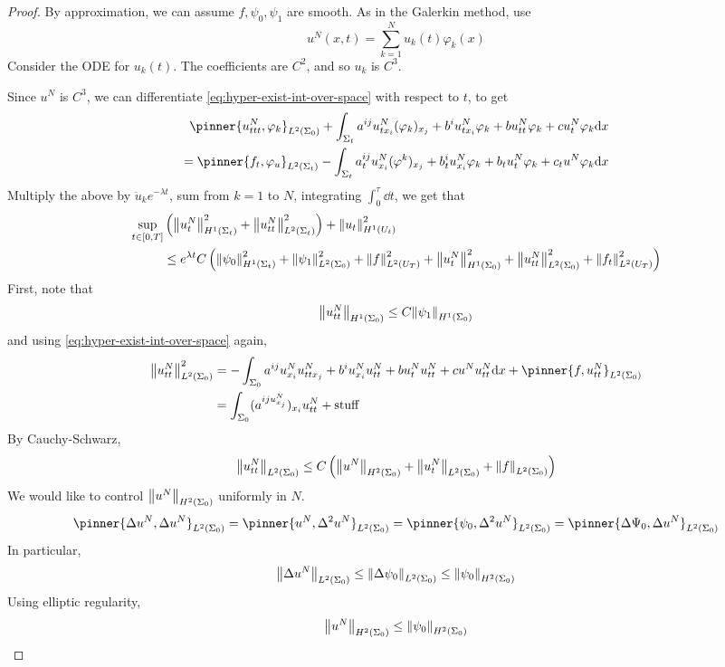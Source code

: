 \documentclass{article}
\begin{document}
\begin{proof}
    By approximation, we can assume \(f, \psi_0, \psi_1\) are smooth. As in the Galerkin method, use
    \[u^N(x, t) = \sum_{k=1}^N u_k(t)\varphi_k(x)\]
    Consider the ODE for \(u_k(t)\). The coefficients are \(C^2\), and so \(u_k\) is \(C^3\).

    Since \(u^N\) is \(C^3\), we can differentiate \cref{eq:hyper-exist-int-over-space} with respect to \(t\), to get
    \begin{align*}
        \pinner{u^N_{ttt}, \varphi_k}_{L^2(\Sigma_0)} + \int_{\Sigma_t}a^{ij}u^N_{tx_i}(\varphi_k)_{x_j} + b^iu^N_{tx_i}\varphi_k + bu^N_{tt}\varphi_k + cu^N_t\varphi_k \dd x \\
        =\pinner{f_t, \varphi_u}_{L^2(\Sigma_t)} - \int_{\Sigma_t}a^{ij}_t u^N_{x_i}(\varphi^k)_{x_j} + b^i_t u^N_{x_i}\varphi_k + b_t u^N_t\varphi_k + c_tu^N\varphi_k \dd x
    \end{align*}
    Multiply the above by \(\ddot u_k e^{-\lambda t}\), sum from \(k = 1\) to \(N\), integrating \(\int_0^\tau \dd t\), we get that
    \begin{align*}
        \sup_{t \in [0, T]}&\left(\norm{u^N_t}_{H^1(\Sigma_t)}^2 + \norm{u^N_{tt}}_{L^2(\Sigma_t)}^2\right) + \norm{u_t}^2_{H^1(U_t)} \\
        &\le e^{\lambda t}C\left(\norm{\psi_0}^2_{H^1(\Sigma_t)} + \norm{\psi_1}^2_{L^2(\Sigma_0)} + \norm{f}^2_{L^2(U_T)} + \norm{u^N_t}^2_{H^1(\Sigma_0)} + \norm{u^N_{tt}}^2_{L^2(\Sigma_0)} + \norm{f_t}^2_{L^2(U_T)}\right)
    \end{align*}
    First, note that
    \[\norm{u^N_{tt}}_{H^1(\Sigma_0)} \le C\norm{\psi_1}_{H^1(\Sigma_0)}\]
    and using \cref{eq:hyper-exist-int-over-space} again,
    \begin{align*}
        \norm{u^N_{tt}}^2_{L^2(\Sigma_0)} &= -\int_{\Sigma_0}a^{ij}u^N_{x_i}u^N_{ttx_j} + b^iu^N_{x_i}u^N_{tt} + bu^N_tu^N_{tt} + cu^Nu^N_{tt} \dd x + \pinner{f, u^N_{tt}}_{L^2(\Sigma_0)} \\
        &= \int_{\Sigma_0}(a^{iju^N_{x_j}})_{x_i}u^N_{tt} + \text{stuff}
    \end{align*}
    By Cauchy-Schwarz,
    \[\norm{u^N_{tt}}_{L^2(\Sigma_0)} \le C\left(\norm{u^N}_{H^2(\Sigma_0)} + \norm{u^N_t}_{L^2(\Sigma_0)} + \norm{f}_{L^2(\Sigma_0)}\right)\]
    We would like to control \(\norm{u^N}_{H^2(\Sigma_0)}\) uniformly in \(N\).
    \begin{align*}
        \pinner{\Delta u^N, \Delta u^N}_{L^2(\Sigma_0)} = \pinner{u^N, \Delta^2u^N}_{L^2(\Sigma_0)} = \pinner{\psi_0, \Delta^2u^N}_{L^2(\Sigma_0)} = \pinner{\Delta\Psi_0, \Delta u^N}_{L^2(\Sigma_0)}
    \end{align*}
    In particular,
    \[\norm{\Delta u^N}_{L^2(\Sigma_0)} \le \norm{\Delta \psi_0}_{L^2(\Sigma_0)} \le \norm{\psi_0}_{H^2(\Sigma_0)}\]
    Using elliptic regularity,
    \[\norm{u^N}_{H^2(\Sigma_0)} \le \norm{\psi_0}_{H^2(\Sigma_0)}\]


\end{proof}
\end{document}
